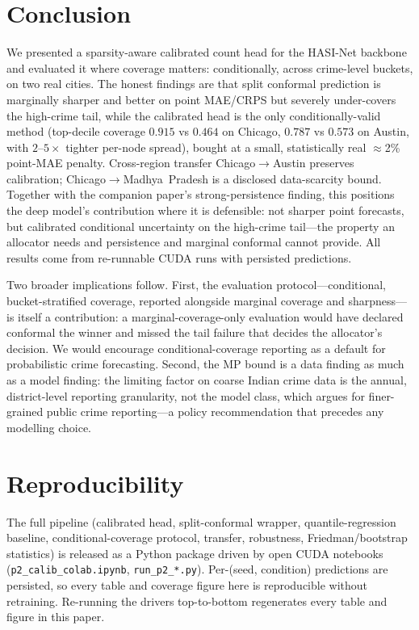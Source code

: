 \documentclass[11pt,conference]{IEEEtran}
\begin{document}
\section{Conclusion}\label{sec:conc}
We presented a sparsity-aware calibrated count head for the HASI-Net backbone and
evaluated it where coverage matters: conditionally, across crime-level buckets,
on two real cities. The honest findings are that split conformal prediction is
marginally sharper and better on point MAE/CRPS but severely under-covers the
high-crime tail, while the calibrated head is the only conditionally-valid method
(top-decile coverage $0.915$ vs $0.464$ on Chicago, $0.787$ vs $0.573$ on Austin,
with $2$--$5\times$ tighter per-node spread), bought at a small, statistically
real $\approx$2\% point-MAE penalty. Cross-region transfer Chicago$\to$Austin
preserves calibration; Chicago$\to$Madhya~Pradesh is a disclosed data-scarcity
bound. Together with the companion paper's strong-persistence finding, this
positions the deep model's contribution where it is defensible: not sharper point
forecasts, but calibrated conditional uncertainty on the high-crime tail---the
property an allocator needs and persistence and marginal conformal cannot
provide. All results come from re-runnable CUDA runs with persisted predictions.

Two broader implications follow. First, the evaluation protocol---conditional,
bucket-stratified coverage, reported alongside marginal coverage and
sharpness---is itself a contribution: a marginal-coverage-only evaluation would
have declared conformal the winner and missed the tail failure that decides the
allocator's decision. We would encourage conditional-coverage reporting as a
default for probabilistic crime forecasting. Second, the MP bound is a data
finding as much as a model finding: the limiting factor on coarse Indian
crime data is the annual, district-level reporting granularity, not the model
class, which argues for finer-grained public crime reporting---a policy
recommendation that precedes any modelling choice.

\section*{Reproducibility}
The full pipeline (calibrated head, split-conformal wrapper, quantile-regression
baseline, conditional-coverage protocol, transfer, robustness, Friedman/bootstrap
statistics) is released as a Python package driven by open CUDA notebooks
(\texttt{p2\_calib\_colab.ipynb}, \texttt{run\_p2\_*.py}). Per-(seed, condition)
predictions are persisted, so every table and coverage figure here is reproducible
without retraining. Re-running the drivers top-to-bottom regenerates every table
and figure in this paper.



\end{document}
